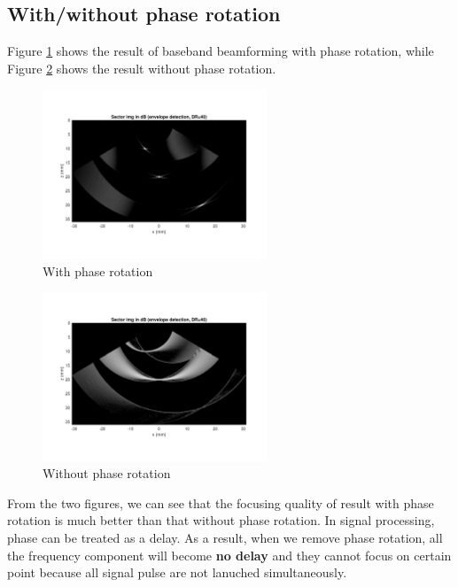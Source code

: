 \documentclass{article}
\begin{document}
\subsection{With/without phase rotation}
Figure \ref{fig:base-phase} shows the result of baseband beamforming with phase rotation, while Figure \ref{fig:base-nophase}
shows the result without phase rotation.
\begin{figure}[H]
    \centering
    \includegraphics[width=0.6\textwidth]{src/Base/b-6-ones.pdf}
    \caption{With phase rotation}
    \label{fig:base-phase}
\end{figure}
\begin{figure}[H]
    \centering
    \includegraphics[width=0.6\textwidth]{src/Base/b-6-ones-no.pdf}
    \caption{Without phase rotation}
    \label{fig:base-nophase}
\end{figure}
From the two figures, we can see that the focusing quality of result with phase rotation is much better than that without phase
rotation. In signal processing, phase can be treated as a delay. As a result, when we remove phase rotation, all the frequency
component will become \textbf{no delay} and they cannot focus on certain point because all signal pulse are not lanuched
simultaneously.
\end{document}
